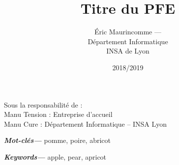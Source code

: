 \documentclass[10pt,a4paper]{article}
\title{Titre du PFE}
\author{\'Eric Maurincomme --- \email{eric.maumau@insa-lyon.fr}\medskip\\
Département Informatique\\
INSA de Lyon}
\date{2018/2019}
\begin{document}

\maketitle
\thispagestyle{empty}

{
\noindent Sous la responsabilité de :\\
Manu Tension : Entreprise d'accueil\\
Manu Cure : Département Informatique -- INSA Lyon
}

\vspace{\baselineskip}\vspace{\baselineskip}

{ %
\fontsize{9}{10.8}

\begin{abstract}
  \rightmargin=1cm \leftmargin=1cm

  \blindtext
\end{abstract}

\leftmargin=1cm
{\small\textbf{\textit{Mot-clés---}} pomme, poire, abricot}

\vspace{\baselineskip}\vspace{\baselineskip}

\begin{otherlanguage}{english} %
  \begin{abstract}
    \rightmargin=1cm \leftmargin=1cm

    \blindtext
  \end{abstract}
\end{otherlanguage}

\leftmargin=1cm
{\small\textbf{\textit{Keywords---}} apple, pear, apricot}
}

\vspace{\baselineskip}\vspace{\baselineskip}

\restoregeometry
{}
\fontsize{10}{12}\selectfont
\end{document}
